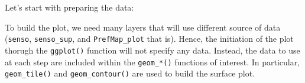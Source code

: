 \documentclass[
]{book}
\newenvironment{Shaded}{\begin{snugshade}}{\end{snugshade}}
\newcommand{\AttributeTok}[1]{\textcolor[rgb]{0.77,0.63,0.00}{#1}}
\newcommand{\DecValTok}[1]{\textcolor[rgb]{0.00,0.00,0.81}{#1}}
\newcommand{\FunctionTok}[1]{\textcolor[rgb]{0.00,0.00,0.00}{#1}}
\newcommand{\NormalTok}[1]{#1}
\newcommand{\OtherTok}[1]{\textcolor[rgb]{0.56,0.35,0.01}{#1}}
\newcommand{\SpecialCharTok}[1]{\textcolor[rgb]{0.00,0.00,0.00}{#1}}
\newcommand{\StringTok}[1]{\textcolor[rgb]{0.31,0.60,0.02}{#1}}
\begin{document}
Let's start with preparing the data:

\begin{Shaded}
\end{Shaded}

To build the plot, we need many layers that will use different source of data (\texttt{senso}, \texttt{senso\_sup}, and \texttt{PrefMap\_plot} that is). Hence, the initiation of the plot thorugh the \texttt{ggplot()} function will not specify any data. Instead, the data to use at each step are included within the \texttt{geom\_*()} functions of interest. In particular, \texttt{geom\_tile()} and \texttt{geom\_contour()} are used to build the surface plot.
\end{document}

